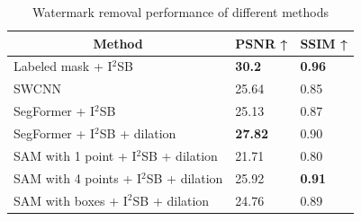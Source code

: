 \begin{table}[!t]
    \centering
    \begin{tabular}{lll}
        \hline
        \multicolumn{1}{c}{\textbf{Method}}                                                & \multicolumn{1}{c}{\textbf{PSNR ↑}} & \multicolumn{1}{c}{\textbf{SSIM ↑}} \\ \hline
        Labeled mask + I$^2$SB    & \textbf{30.2}                        & \textbf{0.96}                        \\ \hline
        SWCNN  \cite{2024swcnn}                                                                             & 25.64                                & 0.85                                 \\  \hline
        SegFormer + I$^2$SB & 25.13                                & 0.87                                 \\ 
        SegFormer + I$^2$SB + dilation & \textbf{27.82}                       & {0.90}                        \\ \hline
        SAM with 1 point + I$^2$SB + dilation  & {21.71}                       & {0.80}                        \\
        SAM with 4 points + I$^2$SB + dilation  & {25.92}                       & \textbf{0.91}                        \\ 
        SAM with boxes + I$^2$SB + dilation & {24.76}                       & {0.89}                        \\ \hline
    \end{tabular}
    \caption{Watermark removal performance of different methods}
    \label{table:wtm-rmv}
\end{table}



